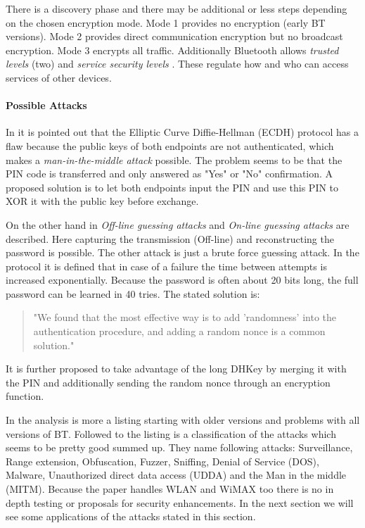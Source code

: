\documentclass[12pt,a4paper]{article}
\begin{document}
There is a discovery phase and there may be additional or less steps depending on the chosen encryption mode. Mode 1 provides no encryption (early BT versions). Mode 2 provides direct communication encryption but no broadcast encryption. Mode 3 encrypts all traffic. Additionally Bluetooth allows \emph{trusted levels} (two) and \emph{service security levels} \cite{DBLP:journals/ijnsec/Lackner13}. These regulate how and who can access services of other devices.

\paragraph{Possible Attacks}
In \cite{DBLP:journals/ijnsec/YehPWH12} it is pointed out that the Elliptic Curve Diffie-Hellman (ECDH) protocol has a flaw because the public keys of both endpoints are not authenticated, which makes a \emph{man-in-the-middle attack} possible. The problem seems to be that the PIN code is transferred and only answered as "Yes" or "No" confirmation. A proposed solution is to let both endpoints input the PIN and use this PIN to XOR it with the public key before exchange.

On the other hand in \cite{DBLP:conf/apnoms/FanSL11} \emph{Off-line guessing attacks} and \emph{On-line guessing attacks} are described. Here capturing the transmission (Off-line) and reconstructing the password is possible. The other attack is just a brute force guessing attack. In the protocol it is defined that in case of a failure the time between attempts is increased exponentially. Because the password is often about 20 bits long, the full password can be learned in 40 tries. The stated solution is:
\begin{quote}
"We found that the most effective way is to add 'randomness' into the authentication procedure, and adding a random nonce is a common solution."\cite{DBLP:conf/apnoms/FanSL11}
\end{quote}
It is further proposed to take advantage of the long DHKey by merging it with the PIN and additionally sending the random nonce through an encryption function.

In \cite{DBLP:journals/ijnsec/Lackner13} the analysis is more a listing starting with older versions and problems with all versions of BT. Followed to the listing is a classification of the attacks which seems to be pretty good summed up. They name following attacks: Surveillance, Range extension, Obfuscation, Fuzzer, Sniffing, Denial of Service (DOS), Malware, Unauthorized direct data access (UDDA) and the Man in the middle (MITM). Because the paper handles WLAN and WiMAX too there is no in depth testing or proposals for security enhancements. In the next section we will see some applications of the attacks stated in this section.
\end{document}
